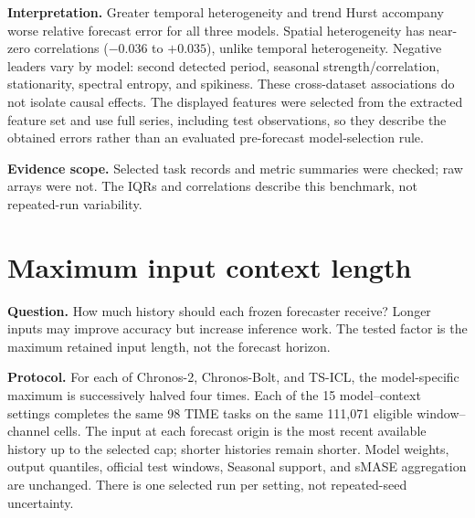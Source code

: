 \documentclass[11pt,a4paper]{article}
\begin{document}
\textbf{Interpretation.} Greater temporal heterogeneity and trend Hurst
accompany worse relative forecast error for all three models. Spatial
heterogeneity has near-zero correlations ($-0.036$ to $+0.035$), unlike
temporal heterogeneity. Negative leaders vary by model: second detected
period, seasonal strength/correlation, stationarity, spectral entropy,
and spikiness.
These cross-dataset associations do not isolate causal effects. The displayed
features were selected from the extracted feature set and use full series,
including test observations, so they describe the obtained errors rather than
an evaluated pre-forecast model-selection rule.

\textbf{Evidence scope.} Selected task records and metric summaries were
checked; raw arrays were not. The IQRs and correlations describe this
benchmark, not repeated-run variability.

\clearpage
\section{Maximum input context length}
\textbf{Question.} How much history should each frozen forecaster receive?
Longer inputs may improve accuracy but increase inference work. The tested
factor is the maximum retained input length, not the forecast horizon.

\textbf{Protocol.} For each of Chronos-2, Chronos-Bolt, and TS-ICL, the
model-specific maximum is successively halved four times. Each of the 15
model--context settings completes the same 98 TIME tasks on the same 111,071
eligible window--channel cells. The input at each forecast origin is the
most recent available history up to the selected cap; shorter histories
remain shorter. Model weights, output quantiles, official test windows,
Seasonal support, and sMASE aggregation are unchanged. There is one selected
run per setting, not repeated-seed uncertainty.
\end{document}
